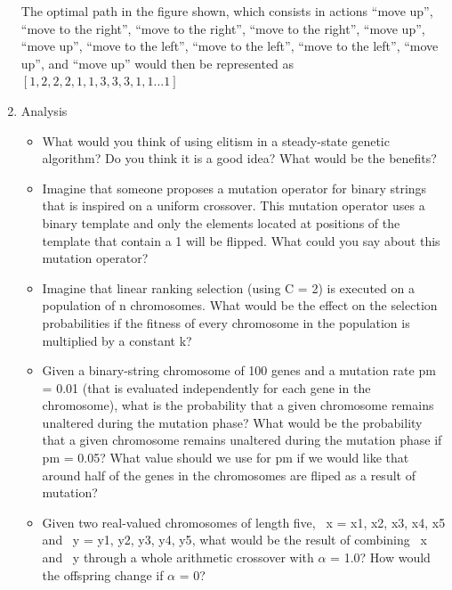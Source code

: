 \documentclass{article}
\begin{document}
\begin{enumerate}
    The optimal path in the figure shown, which consists in actions “move up”, “move to the right”, “move to the right”, “move to the right”, “move up”, “move up”, “move to the left”, “move to the left”, “move to the left”, “move up”, and “move up”  would then be represented as $[1,2,2,2,1,1,3,3,3,1,1 ... 1]$

    \item Analysis
    \begin{itemize}
        \item What would you think of using elitism in a steady-state genetic algorithm? Do you think it is a good idea? What would be the benefits?



        \item  Imagine that someone proposes a mutation operator for binary strings that is inspired on a uniform crossover. This mutation operator uses a binary template and only the elements located at positions of the template that contain a 1 will be flipped. What could you say about this mutation operator?
        \item Imagine that linear ranking selection (using C = 2) is executed on a population of n chromosomes. What would be the effect on the selection probabilities if the fitness of every chromosome in the population is multiplied by a constant k?
        \item Given a binary-string chromosome of 100 genes and a mutation rate pm = 0.01 (that is evaluated independently for each gene in the chromosome), what is the probability that a given chromosome  remains unaltered during the mutation phase? What would be the probability that a given chromosome remains unaltered during the mutation phase if pm = 0.05? What value should we use for pm if we would like that around half of the genes in the chromosomes are fliped as a result of mutation?
        \item Given two real-valued chromosomes of length five, ~x = {x1, x2, x3, x4, x5} and ~y = {y1, y2, y3, y4, y5}, what would be the result of combining ~x and ~y through a whole arithmetic crossover with $\alpha$ = 1.0? How would the offspring change if $\alpha$ = 0?
    \end{itemize}

\end{enumerate}
\end{document}
